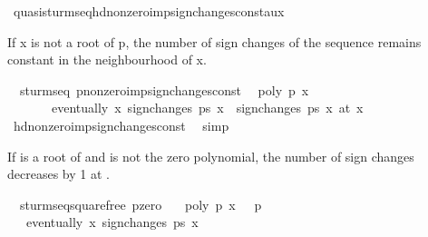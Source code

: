 \begin{isabellebody}
\isamarkupfalse%
%
\endisatagproof
{\isafoldproof}%
%
\isadelimproof
\isanewline
%
\endisadelimproof
\isanewline
{}\isamarkupfalse%
\ quasi{\isacharunderscore}sturm{\isacharunderscore}seq{\isachardot}hd{\isacharunderscore}nonzero{\isacharunderscore}imp{\isacharunderscore}sign{\isacharunderscore}changes{\isacharunderscore}const{\isacharunderscore}aux%
\begin{isamarkuptext}%
If x is not a root of p, the number of sign changes of the sequence 
  remains constant in the neighbourhood of x.%
\end{isamarkuptext}%
\isamarkuptrue%
\isamarkupfalse%
\ {\isacharparenleft}\ sturm{\isacharunderscore}seq{\isacharparenright}\ p{\isacharunderscore}nonzero{\isacharunderscore}imp{\isacharunderscore}sign{\isacharunderscore}changes{\isacharunderscore}const{\isacharcolon}\isanewline
\ \ {\isachardoublequoteopen}poly\ p\ x\ {\isasymnoteq}\ {}\ {\isasymLongrightarrow}\ \isanewline
\ \ \ \ \ \ \ eventually\ {\isacharparenleft}{\isasymlambda}x{\isachardot}\ sign{\isacharunderscore}changes\ ps\ x\ {\isacharequal}\ sign{\isacharunderscore}changes\ ps\ x\ {\isacharparenleft}at\ x\isanewline
%
\isadelimproof
\ \ %
\endisadelimproof
%
\isatagproof
{}\isamarkupfalse%
\ hd{\isacharunderscore}nonzero{\isacharunderscore}imp{\isacharunderscore}sign{\isacharunderscore}changes{\isacharunderscore}const\ \isamarkupfalse%
\ simp%
\endisatagproof
{\isafoldproof}%
%
\isadelimproof
%
\endisadelimproof
%
\begin{isamarkuptext}%
If  is a root of  and  is not the 
  zero polynomial, the number of sign changes decreases by 1 at 
  .%
\end{isamarkuptext}%
\isamarkuptrue%
\isamarkupfalse%
\ {\isacharparenleft}\ sturm{\isacharunderscore}seq{\isacharunderscore}squarefree{\isacharparenright}\ p{\isacharunderscore}zero{\isacharcolon}\isanewline
\ \ \ {\isachardoublequoteopen}poly\ p\ x\ {\isacharequal}\ {}{\isachardoublequoteclose}\ {\isachardoublequoteopen}p\ {\isasymnoteq}\ {}{\isachardoublequoteclose}\isanewline
\ \ \ {\isachardoublequoteopen}eventually\ {\isacharparenleft}{\isasymlambda}x{\isachardot}\ sign{\isacharunderscore}changes\ ps\ x\ {\isacharequal}\ \isanewline

\end{isabellebody}
